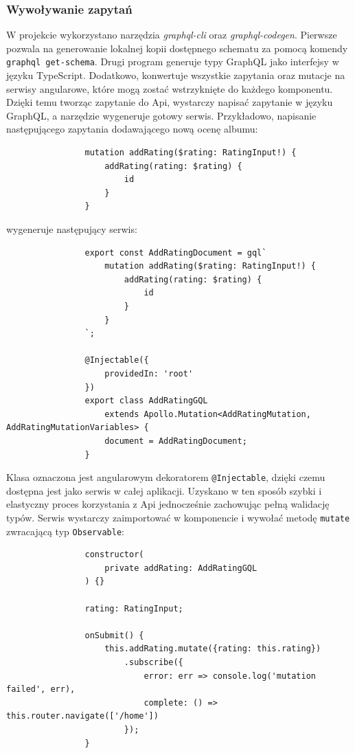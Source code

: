		\subsubsection*{Wywoływanie zapytań}
			W projekcie wykorzystano narzędzia \emph{graphql-cli} oraz \emph{graphql-codegen}.
			Pierwsze pozwala na generowanie lokalnej kopii dostępnego schematu za pomocą komendy \verb|graphql get-schema|.
			Drugi program generuje typy GraphQL jako interfejsy w języku TypeScript.
			Dodatkowo, konwertuje wszystkie zapytania oraz mutacje na serwisy angularowe, które mogą zostać wstrzyknięte do każdego komponentu.
			Dzięki temu tworząc zapytanie do Api, wystarczy napisać zapytanie w języku GraphQL, a narzędzie wygeneruje gotowy serwis.
			Przykładowo, napisanie następującego zapytania dodawającego nową ocenę albumu:
			\begin{lstlisting}
				mutation addRating($rating: RatingInput!) {
					addRating(rating: $rating) {
						id
					}
				}
			\end{lstlisting}
			wygeneruje następujący serwis:
			\begin{lstlisting}
				export const AddRatingDocument = gql`
					mutation addRating($rating: RatingInput!) {
						addRating(rating: $rating) {
							id
						}
					}
				`;
				
				@Injectable({
					providedIn: 'root'
				})
				export class AddRatingGQL
					extends Apollo.Mutation<AddRatingMutation, AddRatingMutationVariables> {
					document = AddRatingDocument;
				}
			\end{lstlisting}

			Klasa oznaczona jest angularowym dekoratorem \verb|@Injectable|, dzięki czemu dostępna jest jako serwis w całej aplikacji.
			Uzyskano w ten sposób szybki i elastyczny proces korzystania z Api jednocześnie zachowując pełną walidację typów.
			Serwis wystarczy zaimportować w komponencie i wywołać metodę \verb|mutate| zwracającą typ \verb|Observable|:
			\begin{lstlisting}
				constructor(
					private addRating: AddRatingGQL
				) {}

				rating: RatingInput;

				onSubmit() {
					this.addRating.mutate({rating: this.rating})
						.subscribe({
							error: err => console.log('mutation failed', err),
							complete: () => this.router.navigate(['/home'])
						});
				}
			\end{lstlisting}

